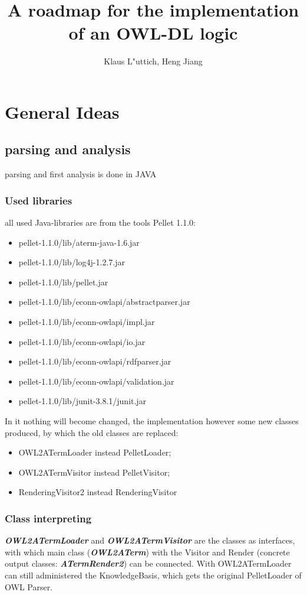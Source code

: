 \documentclass[11pt,a4paper]{article}
\begin{document}
\title{A roadmap for the implementation of an OWL-DL logic}
\author{Klaus L"uttich, Heng Jiang}
\maketitle


\section{General Ideas}

\subsection{parsing and analysis}
parsing and first analysis is done in JAVA
   \subsubsection{Used libraries}
   all used Java-libraries are from the tools Pellet 1.1.0:
   \begin{itemize}
   \item pellet-1.1.0/lib/aterm-java-1.6.jar
   \item pellet-1.1.0/lib/log4j-1.2.7.jar
   \item pellet-1.1.0/lib/pellet.jar
   \item pellet-1.1.0/lib/econn-owlapi/abstractparser.jar
   \item pellet-1.1.0/lib/econn-owlapi/impl.jar
   \item pellet-1.1.0/lib/econn-owlapi/io.jar  
   \item pellet-1.1.0/lib/econn-owlapi/rdfparser.jar
   \item pellet-1.1.0/lib/econn-owlapi/validation.jar
   \item pellet-1.1.0/lib/junit-3.8.1/junit.jar
   \end{itemize}
In it nothing will become changed, the implementation however some new classes produced, by which the old classes are replaced:
   \begin{itemize}
      \item OWL2ATermLoader instead PelletLoader;
   	  \item OWL2ATermVisitor instead PelletVisitor;
      \item RenderingVisitor2 instead RenderingVisitor
   \end{itemize}

\subsubsection{Class interpreting}
\textbf{\emph{OWL2ATermLoader} }and \textbf{\emph{OWL2ATermVisitor}} are the classes as interfaces, with which main class (\textbf{\emph{OWL2ATerm}}) with the Visitor and Render (concrete output classes: \textbf{\emph{ATermRender2}}) can be connected. With OWL2ATermLoader can still administered the KnowledgeBasis, which gets the original PelletLoader of OWL Parser.\\
   
\end{document}
